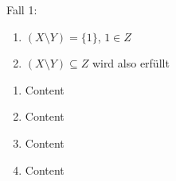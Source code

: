 \documentclass[a4paper, 11pt]{article}
\begin{document}
Fall 1:
\begin{enumerate}
    \item[] $(X \setminus Y) = \{1\}$, \hspace{0.5cm} $1 \in Z$
    \item[] $(X \setminus Y) \subseteq Z$ wird also erfüllt
\end{enumerate}

\vspace{1cm}

\begin{enumerate}
    \item Content
    \item Content
    \item Content
    \item Content
\end{enumerate}
\end{document}

